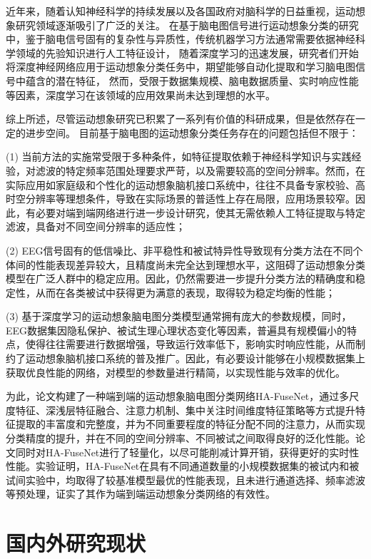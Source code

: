 近年来，随着认知神经科学的持续发展以及各国政府对脑科学的日益重视，运动想象研究领域逐渐吸引了广泛的关注。
在基于脑电图信号进行运动想象分类的研究中，鉴于脑电信号固有的复杂性与异质性，传统机器学习方法通常需要依据神经科学领域的先验知识进行人工特征设计，
随着深度学习的迅速发展，研究者们开始将深度神经网络应用于运动想象分类任务中，期望能够自动化提取和学习脑电图信号中蕴含的潜在特征，
然而，受限于数据集规模、脑电数据质量、实时响应性能等因素，深度学习在该领域的应用效果尚未达到理想的水平。

综上所述，尽管运动想象研究已积累了一系列有价值的科研成果，但是依然存在一定的进步空间。
目前基于脑电图的运动想象分类任务存在的问题包括但不限于：

(1) 当前方法的实施常受限于多种条件，如特征提取依赖于神经科学知识与实践经验，对滤波的特定频率范围处理要求严苛，以及需要较高的空间分辨率。然而，在实际应用如家庭级和个性化的运动想象脑机接口系统中，往往不具备专家校验、高时空分辨率等理想条件，导致在实际场景的普适性上存在局限，应用场景较窄。因此，有必要对端到端网络进行进一步设计研究，使其无需依赖人工特征提取与特定滤波，具备对不同空间分辨率的适应性；

(2) EEG信号固有的低信噪比、非平稳性和被试特异性导致现有分类方法在不同个体间的性能表现差异较大，且精度尚未完全达到理想水平，这阻碍了运动想象分类模型在广泛人群中的稳定应用。因此，仍然需要进一步提升分类方法的精确度和稳定性，从而在各类被试中获得更为满意的表现，取得较为稳定均衡的性能；

(3) 基于深度学习的运动想象脑电图分类模型通常拥有庞大的参数规模，同时，EEG数据集因隐私保护、被试生理心理状态变化等因素，普遍具有规模偏小的特点，使得往往需要进行数据增强，导致运行效率低下，影响实时响应性能，从而制约了运动想象脑机接口系统的普及推广。因此，有必要设计能够在小规模数据集上获取优良性能的网络，对模型的参数量进行精简，以实现性能与效率的优化。

为此，论文构建了一种端到端的运动想象脑电图分类网络HA-FuseNet，通过多尺度特征、深浅层特征融合、注意力机制、集中关注时间维度特征策略等方式提升特征提取的丰富度和完整度，并为不同重要程度的特征分配不同的注意力，从而实现分类精度的提升，并在不同的空间分辨率、不同被试之间取得良好的泛化性能。论文同时对HA-FuseNet进行了轻量化，以尽可能削减计算开销，获得更好的实时性性能。实验证明，HA-FuseNet在具有不同通道数量的小规模数据集的被试内和被试间实验中，均取得了较基准模型最优的性能表现，且未进行通道选择、频率滤波等预处理，证实了其作为端到端运动想象分类网络的有效性。

\section{国内外研究现状}

